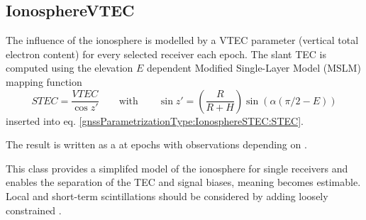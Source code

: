 \subsection{IonosphereVTEC}\label{gnssParametrizationType:ionosphereVTEC}
The influence of the ionosphere is modelled by a VTEC parameter (vertical total electron content)
for every selected receiver each epoch. The slant TEC is computed
using the elevation $E$ dependent Modified Single-Layer Model (MSLM) mapping function
\begin{equation}\label{gnssParametrizationType:IonosphereVTEC:STEC}
  STEC = \frac{VTEC}{\cos z'}
  \qquad\text{with}\qquad
  \sin z'= \left(\frac{R}{R+H}\right)\sin\left(\alpha(\pi/2-E)\right)
\end{equation}
inserted into eq. \eqref{gnssParametrizationType:IonosphereSTEC:STEC}.

The result is written as a  at epochs with observations
depending on .

This class provides a simplifed model of the ionosphere for single receivers
and enables the separation of the TEC and signal biases, meaning
 becomes estimable.
Local and short-term scintillations should be considered by adding loosely constrained
.


